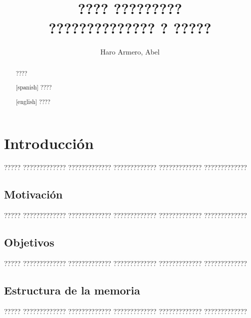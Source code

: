 \documentclass[11pt,catalan,listoffigures,listoftables]{tfgetsinf}
\title{???? ????????? \\
         ?????????????? ? ?????}
\author{Haro Armero, Abel}
\begin{document}

\begin{abstract}
????
\end{abstract}
\begin{abstract}[spanish]
????
\end{abstract}
\begin{abstract}[english]
????
\end{abstract}


\mainmatter


\chapter{Introducci\'on}

????? ????????????? ????????????? ????????????? ????????????? ?????????????

\section{Motivaci\'on}

????? ????????????? ????????????? ????????????? ????????????? ????????????? 

\section{Objetivos}

????? ????????????? ????????????? ????????????? ????????????? ?????????????

\section{Estructura de la memoria}

????? ????????????? ????????????? ????????????? ????????????? ????????????? 
\end{document}
